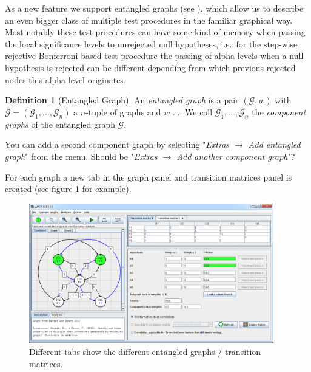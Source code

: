\documentclass[a4paper, 10pt]{article}\usepackage[]{graphicx}\usepackage[]{color}
\numberwithin{equation}{section}
\theoremstyle{definition}
\newtheorem{Def}{Definition}[section]
\theoremstyle{plain}
\begin{document}
As a new feature we support entangled graphs (see
\cite{maurer2013memory}), which allow us to describe an even bigger
class of multiple test procedures in the familiar graphical way. Most
notably these test procedures can have some kind of memory when
passing the local significance levels to unrejected null hypotheses,
i.e.\ for the step-wise rejective Bonferroni based test procedure the
passing of alpha levels when a null hypothesis is rejected can be
different depending from which previous rejected nodes this alpha
level originates.

\begin{Def}[Entangled Graph]
  An \emph{entangled graph} is a pair $(\mathcal{G}, w)$ with
  $\mathcal{G}=(\mathcal{G}_1,\ldots, \mathcal{G}_n)$ a $n$-tuple of
  graphs and $w$ $\ldots$.  We call $\mathcal{G}_1,\ldots,
  \mathcal{G}_n$ the \emph{component graphs}
  of the entangled graph $\mathcal{G}$.
\end{Def}


You can add a second component graph by selecting "\emph{Extras
  $\rightarrow$ Add entangled graph}" from the menu. Should be
"\emph{Extras $\rightarrow$ Add another component graph}"?


For each graph a new tab in the graph panel and transition matrices
panel is created (see figure \ref{fig:entangledGUI} for example).


\begin{figure}[ht]
  \centering    
  \includegraphics[width=0.95\textwidth]{pictures/entangled.png}
  \caption{\label{fig:entangledGUI} Different tabs show the different entangled graphs / transition matrices.}
\end{figure}
\end{document}
